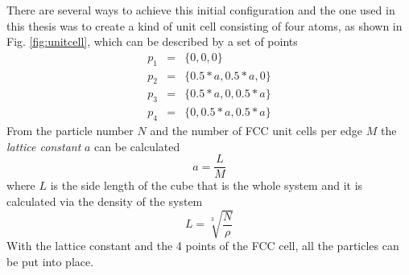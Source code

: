 \documentclass[12pt]{article}
\begin{document}
There are several ways to achieve this initial configuration and the one used in this thesis \cite{buffalo} was to create a kind of unit cell 
consisting of four atoms, as shown in Fig. \ref{fig:unitcell}, which can be described by a set of points
\begin{eqnarray*}
    p_1 &=& \{0,0,0\}\\
    p_2 &=& \{0.5*a,0.5*a,0\}\\
    p_3 &=& \{0.5*a,0,0.5*a\}\\
    p_4 &=& \{0,0.5*a,0.5*a\}
\end{eqnarray*}
From the particle number $N$ and the number of FCC unit cells per edge $M$ the \textit{lattice constant} $a$ can be calculated
\begin{equation}
    a = \frac{L}{M}
\end{equation}
where $L$ is the side length of the cube that is the whole system and it is calculated via the density of the system
\begin{equation}
    L = \sqrt[3]{\frac{N}{\rho}}
\end{equation}
With the lattice constant and the 4 points of the FCC cell, all the particles can be put into place.
\end{document}
